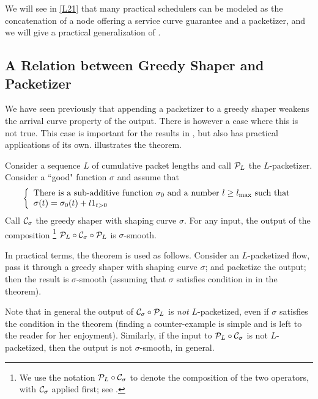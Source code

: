We will see in \cref{L21} that many practical schedulers can be
modeled as the concatenation of a node offering a service curve
guarantee and a packetizer, and we will give a practical
generalization of .

\subsection{A Relation between Greedy Shaper and Packetizer}

We have seen previously that appending a packetizer to a greedy
shaper weakens the arrival curve property of the output. There is
however a case where this is not true. This case is important for
the results in , but also has practical applications
of its own.  illustrates the theorem.
\begin{figure}[htbp]
\end{figure}
\begin{theorem}
Consider a sequence $L$ of cumulative packet lengths and call
$\mathcal P_L$ the $L$-packetizer. Consider a ``good" function $\sigma$
and assume that
\begin{equation}\mylabel{eq:condsigma}
\bracket{
  \mbox{There is a sub-additive function
$\sigma_0$ and a number $l \geq l_{\max}$ such that}\\
  \sigma(t)=\sigma_0(t) + l 1_{t>0}
 }
\end{equation}
Call $\mathcal C_{\sigma}$ the greedy shaper with shaping curve
$\sigma$.
For any input, the output of the composition%
\footnote{We use the notation $\mathcal P_L \circ \mathcal C_{\sigma}$ to
denote the composition of the two operators, with $\mathcal C_{\sigma}$
applied first;  see .}%
$\mathcal P_L \circ \mathcal C_{\sigma} \circ \mathcal P_L$ is $\sigma$-smooth.
\end{theorem}

In practical terms, the theorem is used as follows. Consider an
$L$-packetized flow, pass it through a greedy shaper with shaping
curve $\sigma$; and packetize the output; then the result is
$\sigma$-smooth (assuming that $\sigma$ satisfies condition in
 in the theorem).

Note that in general the output of $\mathcal C_{\sigma} \circ \mathcal P_L $
is \emph{not} $L$-packetized, even if $\sigma$ satisfies the
condition in the theorem (finding a counter-example is simple and
is left to the reader for her enjoyment). Similarly, if the input
to $\mathcal P_L \circ \mathcal C_{\sigma}$ is not $L$-packetized, then the
output is not $\sigma$-smooth, in general.

